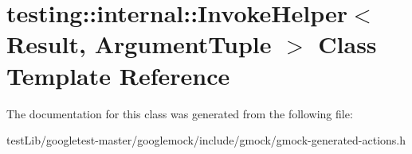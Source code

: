 \hypertarget{classtesting_1_1internal_1_1InvokeHelper}{}\section{testing\+:\+:internal\+:\+:Invoke\+Helper$<$ Result, Argument\+Tuple $>$ Class Template Reference}
\label{classtesting_1_1internal_1_1InvokeHelper}


The documentation for this class was generated from the following file\+:\begin{DoxyCompactItemize}
\item 
test\+Lib/googletest-\/master/googlemock/include/gmock/gmock-\/generated-\/actions.\+h\end{DoxyCompactItemize}
